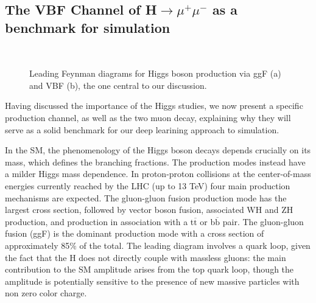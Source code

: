 \subsection{The VBF Channel of H$\rightarrow\mu^+\mu^-$ as a benchmark for simulation}\label{sec:targets}

\begin{figure}
    \myfloatalign
     \quad
     \\
    \caption[ggF and VBF]{Leading Feynman diagrams for Higgs boson production via ggF (a) and VBF (b), the one central to our discussion.}\label{fig:feypro}
\end{figure}
Having discussed the importance of the Higgs studies, we now present a specific production channel, as well as the two muon decay, explaining why they will serve as a solid benchmark for our deep learining approach to simulation.

In the SM, the phenomenology of the Higgs boson decays depends crucially on its mass,
which defines the branching fractions. The production modes instead have a milder Higgs
mass dependence. In proton-proton collisions at the center-of-mass energies currently reached by the LHC
(up to 13 TeV) four main production mechanisms are expected. The gluon-gluon fusion
production mode has the largest cross section, followed by vector boson fusion, associated
WH and ZH production, and production in association with a t$\overline{\text{t}}$  or b$\overline{\text{b}}$ pair. The gluon-gluon fusion (ggF) is the dominant production mode with a cross section of
approximately 85$\%$ of the total. The leading diagram involves a quark loop, given the fact that the H does not directly couple with massless gluons: the main
contribution to the SM amplitude arises from the top quark loop, though the amplitude is
potentially sensitive to the presence of new massive particles with non zero color charge.

